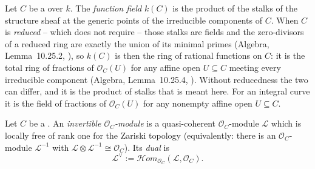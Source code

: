 \begin{definition}
\label{def:pcb-function-field}
Let \(C\) be a  over \(k\).  The
\emph{function field} \(k(C)\) is the product of the stalks of the
structure sheaf at the generic points of the irreducible components
of \(C\).  When \(C\) is \emph{reduced} -- which 
does not require -- those stalks are fields and the zero-divisors of a
reduced ring are exactly the union of its minimal primes (Algebra,
Lemma~10.25.2, ), so \(k(C)\) is then the ring of
rational functions on \(C\): it is the total ring of fractions of
\(\mathcal O_C(U)\) for any affine open \(U\subseteq C\) meeting every
irreducible component (Algebra, Lemma~10.25.4, ).
Without reducedness the two can differ, and it is the product of
stalks that is meant here.  For
an integral curve it is the field of fractions of
\(\mathcal O_C(U)\) for any nonempty affine open \(U\subseteq C\).
\end{definition}

\begin{definition}
\label{def:pcb-invertible-module}
Let \(C\) be a .  An
\emph{invertible \(\mathcal O_C\)-module} is a quasi-coherent
\(\mathcal O_C\)-module \(\mathcal L\) which is locally free of rank
one for the Zariski topology (equivalently: there is an
\(\mathcal O_C\)-module \(\mathcal L^{-1}\) with
\(\mathcal L\otimes\mathcal L^{-1}\cong\mathcal O_C\)).  Its
\emph{dual} is
\[
 \mathcal L^{\vee}:=\mathcal{H}om_{\mathcal O_C}(\mathcal L,\mathcal O_C).
\]
\leanok
{}
\end{definition}

